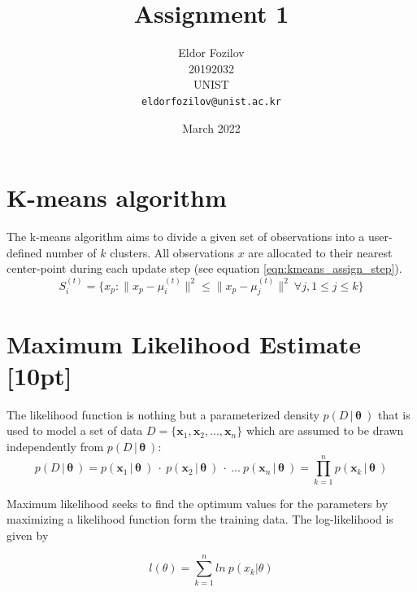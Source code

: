 \documentclass{article}
\title{Assignment 1}
\date{March 2022}
\author{%
  Eldor Fozilov \\ %
  20192032 \\ %
  UNIST \\
  \texttt{eldorfozilov@unist.ac.kr} \\%
}
\begin{document}


\maketitle %

\section{K-means algorithm} %
The k-means algorithm aims to divide a given set of observations into a user-defined number of $k$ clusters. All observations $x$ are allocated to their nearest center-point during each update step (see equation \eqref{eqn:kmeans_assign_step}).\\  %

\begin{equation}
S_i^{(t)} = \big \{ x_p : \big \| x_p - \mu^{(t)}_i \big \|^2 \le \big \| x_p - \mu^{(t)}_j \big \|^2 \ \forall j, 1 \le j \le k \big\}
\label{eqn:kmeans_assign_step}
\end{equation}


\section{Maximum Likelihood Estimate [10pt]}
The likelihood function is nothing but a parameterized density $p(D\,|\,\bm{\theta}\ )$ that is used to model a set of data $D = \{ \bm{x}_1, \bm{x}_2, ..., \bm{x}_n \}$ which are assumed to be drawn independently from $p(D\,|\,\bm{\theta}\ )$:
\begin{equation}
  p(D\,|\,\bm{\theta}\ ) = p(\bm{x}_1\,|\,\bm{\theta}\ )\ \cdot \ p(\bm{x}_2\,|\,\boldsymbol{\theta}\ ) \ \cdot \ ...\ p(\bm{x}_n\,|\,\bm{\theta}\ )
  = \prod_{k = 1}^n p(\bm{x}_k\,|\,\bm{\theta}\ )
\end{equation} 

\noindent Maximum likelihood seeks to find the optimum values for the parameters by
maximizing a likelihood function form the training data. The log-likelihood is
given by

\begin{equation}
    l(\theta) = \sum_{k=1}^n \mathit{ln}\ p(x_k|\theta)
\end{equation}
\end{document}
